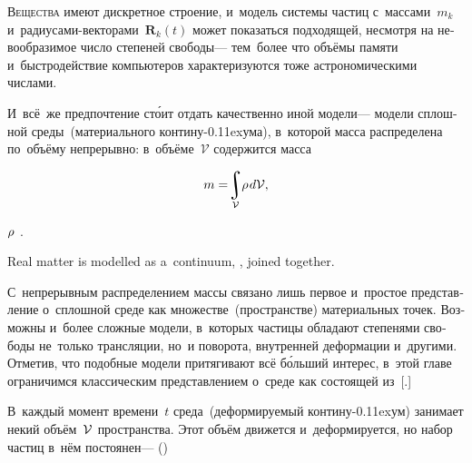 \begin{otherlanguage}{russian}

\lettrine[lines=2, findent=2pt, nindent=0pt]{В}{ещества} имеют дискретное строение, и~модель системы частиц с~массами~${m_k}$ и~радиусами\hbox{-}векторами~${\bm{R}_k (t)}$ может показаться подходящей, несмотря на невообразимое число степеней свободы\:--- тем~более что объёмы памяти и~быстродействие компьютеров характеризуются тоже астрономическими числами.

И~всё~же предпочтение ст\'{о}ит отдать качественно иной модели\:--- модели сплошной среды~(материального контину\kern-0.11exума), в~которой масса распределена по~объёму непрерывно: в~объёме~$\mathcal{V}$ содержится масса

\nopagebreak\vspace{-0.5em}\begin{equation}
m = \hspace{-0.5ex} \integral\displaylimits_{\mathcal{V}} \hspace{-0.5ex} \rho \hspace{.2ex} d\mathcal{V} ,
\end{equation}

\vspace{-0.25em}\noindent {} ${\rho\hspace{.1ex}}$\ru{\:---} .

Real matter is modelled as a~continuum,    , joined together.

С~непрерывным распределением массы связано лишь первое и~простое представление о~сплошной среде как множестве~(пространстве) материальных точек. Возможны и~более сложные модели, в~которых частицы обладают степенями свободы не~только трансляции, но~и поворота, внутренней деформации и~другими. Отметив, что подобные модели притягивают всё б\'{о}льший интерес, в~этой главе ограничимся классическим представлением о~среде как состоящей из~[.]

В~каждый момент времени~$t$ среда~(деформируемый контину\kern-0.11exум) занимает некий объём~${\mathcal{V}\hspace{.1ex}}$ пространства. Этот объём движется и~деформируется, но набор частиц в~нём постоянен\:---  ()


\end{otherlanguage}
